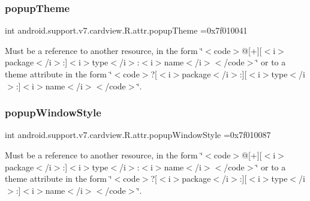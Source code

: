 \subsubsection{\texorpdfstring{popup\+Theme}{popupTheme}}
{\footnotesize\ttfamily int android.\+support.\+v7.\+cardview.\+R.\+attr.\+popup\+Theme =0x7f010041\hspace{0.3cm}{\ttfamily [static]}}

Must be a reference to another resource, in the form \char`\"{}$<$code$>$@\mbox{[}+\mbox{]}\mbox{[}$<$i$>$package$<$/i$>$\+:\mbox{]}$<$i$>$type$<$/i$>$\+:$<$i$>$name$<$/i$>$$<$/code$>$\char`\"{} or to a theme attribute in the form \char`\"{}$<$code$>$?\mbox{[}$<$i$>$package$<$/i$>$\+:\mbox{]}\mbox{[}$<$i$>$type$<$/i$>$\+:\mbox{]}$<$i$>$name$<$/i$>$$<$/code$>$\char`\"{}. \mbox{\label{classandroid_1_1support_1_1v7_1_1cardview_1_1R_1_1attr_a1ecca8fae6e4b82298fa9804db40fbaa}} 
\subsubsection{\texorpdfstring{popup\+Window\+Style}{popupWindowStyle}}
{\footnotesize\ttfamily int android.\+support.\+v7.\+cardview.\+R.\+attr.\+popup\+Window\+Style =0x7f010087\hspace{0.3cm}{\ttfamily [static]}}

Must be a reference to another resource, in the form \char`\"{}$<$code$>$@\mbox{[}+\mbox{]}\mbox{[}$<$i$>$package$<$/i$>$\+:\mbox{]}$<$i$>$type$<$/i$>$\+:$<$i$>$name$<$/i$>$$<$/code$>$\char`\"{} or to a theme attribute in the form \char`\"{}$<$code$>$?\mbox{[}$<$i$>$package$<$/i$>$\+:\mbox{]}\mbox{[}$<$i$>$type$<$/i$>$\+:\mbox{]}$<$i$>$name$<$/i$>$$<$/code$>$\char`\"{}. \mbox{\label{classandroid_1_1support_1_1v7_1_1cardview_1_1R_1_1attr_ade123c629c5e246957de011a6abb2d72}} 
